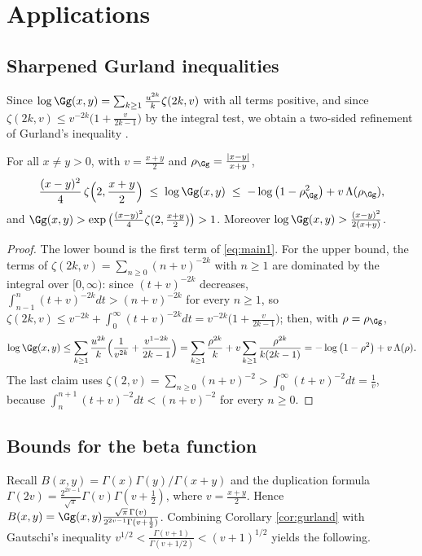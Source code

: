 \section{Applications}\label{sec:app}

\subsection{Sharpened Gurland inequalities}
Since $\log\Gg(x,y)=\sum_{k\ge1}\frac{u^{2k}}{k}\zeta(2k,v)$ with all terms positive, and
since $\zeta(2k,v)\le v^{-2k}\big(1+\frac{v}{2k-1}\big)$ by the integral test, we obtain a
two-sided refinement of Gurland's inequality \cite{Gurland56}.

\begin{corollary}\label{cor:gurland}
For all $x\ne y>0$, with $v=\frac{x+y}{2}$ and $\rho_{\Gg}=\frac{|x-y|}{x+y}$,
\[
  \frac{(x-y)^{2}}{4}\,\zeta\Big(2,\frac{x+y}{2}\Big)\;\le\;\log\Gg(x,y)\;\le\;
  -\log\big(1-\rho_{\Gg}^{2}\big)+v\,\Lambda(\rho_{\Gg}),
\]
and $\Gg(x,y)>\exp\big(\frac{(x-y)^{2}}{4}\zeta(2,\frac{x+y}{2})\big)>1$. Moreover
$\log\Gg(x,y)>\frac{(x-y)^{2}}{2(x+y)}$.
\end{corollary}

\begin{proof}
The lower bound is the first term of \eqref{eq:main1}. For the upper bound, the
terms of $\zeta(2k,v)=\sum_{n\ge0}(n+v)^{-2k}$ with $n\ge1$ are dominated by the
integral over $[0,\infty)$: since $(t+v)^{-2k}$ decreases,
$\int_{n-1}^{n}(t+v)^{-2k}dt>(n+v)^{-2k}$ for every $n\ge1$, so
$\zeta(2k,v)\le v^{-2k}+\int_{0}^{\infty}(t+v)^{-2k}dt
=v^{-2k}\big(1+\frac{v}{2k-1}\big)$; then, with $\rho=\rho_{\Gg}$,
\[
  \log\Gg(x,y)\le\sum_{k\ge1}\frac{u^{2k}}{k}\Big(\frac{1}{v^{2k}}
   +\frac{v^{1-2k}}{2k-1}\Big)
  =\sum_{k\ge1}\frac{\rho^{2k}}{k}+v\sum_{k\ge1}\frac{\rho^{2k}}{k(2k-1)}
  =-\log\big(1-\rho^{2}\big)+v\,\Lambda(\rho).
\]
The last claim uses
$\zeta(2,v)=\sum_{n\ge0}(n+v)^{-2}>\int_{0}^{\infty}(t+v)^{-2}dt=\frac1v$,
because $\int_{n}^{n+1}(t+v)^{-2}dt<(n+v)^{-2}$ for every $n\ge0$.
\end{proof}

\subsection{Bounds for the beta function}
Recall $B(x,y)=\Gamma(x)\Gamma(y)/\Gamma(x+y)$ and the duplication formula
$\Gamma(2v)=\frac{2^{2v-1}}{\sqrt\pi}\Gamma(v)\Gamma(v+\frac12)$, where $v=\frac{x+y}{2}$.
Hence $B(x,y)=\Gg(x,y)\frac{\sqrt\pi\,\Gamma(v)}{2^{2v-1}\Gamma(v+\frac12)}$. Combining
Corollary \ref{cor:gurland} with Gautschi's inequality
$v^{1/2}<\frac{\Gamma(v+1)}{\Gamma(v+1/2)}<(v+1)^{1/2}$ \cite{Gautschi74} yields the
following.

